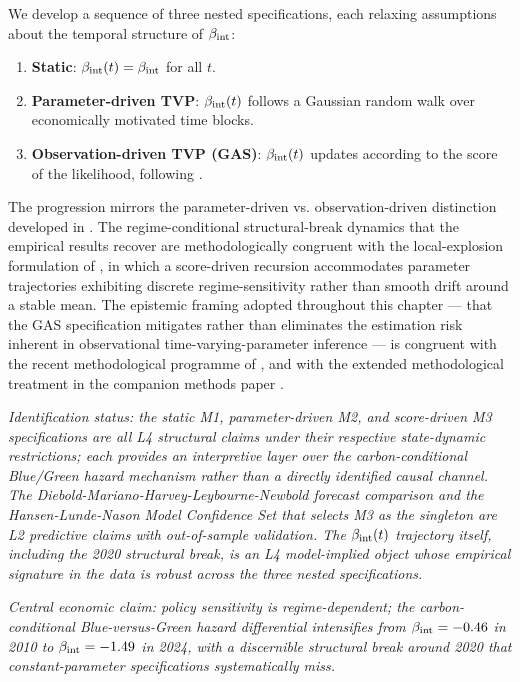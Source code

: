 We develop a sequence of three nested specifications, each relaxing assumptions about the temporal structure of $\beta_{\mathrm{int}}$:
\begin{enumerate}
    \item[(M1)] \textbf{Static}: $\beta_{\mathrm{int}}(t) = \beta_{\mathrm{int}}$ for all $t$.
    \item[(M2)] \textbf{Parameter-driven TVP}: $\beta_{\mathrm{int}}(t)$ follows a Gaussian random walk over economically motivated time blocks.
    \item[(M3)] \textbf{Observation-driven TVP (GAS)}: $\beta_{\mathrm{int}}(t)$ updates according to the score of the likelihood, following \cite{creal2008general, creal2013generalized}.
\end{enumerate}
The progression mirrors the parameter-driven vs. observation-driven distinction developed in \cite{koopman2016predicting}. The regime-conditional structural-break dynamics that the empirical results recover are methodologically congruent with the local-explosion formulation of \cite{blasques2022local}, in which a score-driven recursion accommodates parameter trajectories exhibiting discrete regime-sensitivity rather than smooth drift around a stable mean. The epistemic framing adopted throughout this chapter --- that the GAS specification mitigates rather than eliminates the estimation risk inherent in observational time-varying-parameter inference --- is congruent with the recent methodological programme of \cite{blasques2024mitigating}, and with the extended methodological treatment in the companion methods paper \cite{saakstra2026paper1}.

\noindent\emph{Identification status: the static M1, parameter-driven M2, and score-driven M3 specifications are all L4 structural claims under their respective state-dynamic restrictions; each provides an interpretive layer over the carbon-conditional Blue/Green hazard mechanism rather than a directly identified causal channel. The Diebold-Mariano-Harvey-Leybourne-Newbold forecast comparison and the Hansen-Lunde-Nason Model Confidence Set that selects M3 as the singleton are L2 predictive claims with out-of-sample validation. The $\beta_{\mathrm{int}}(t)$ trajectory itself, including the 2020 structural break, is an L4 model-implied object whose empirical signature in the data is robust across the three nested specifications.}

\noindent\emph{Central economic claim: policy sensitivity is regime-dependent; the carbon-conditional Blue-versus-Green hazard differential intensifies from $\beta_{\mathrm{int}} = -0.46$ in 2010 to $\beta_{\mathrm{int}} = -1.49$ in 2024, with a discernible structural break around 2020 that constant-parameter specifications systematically miss.}

